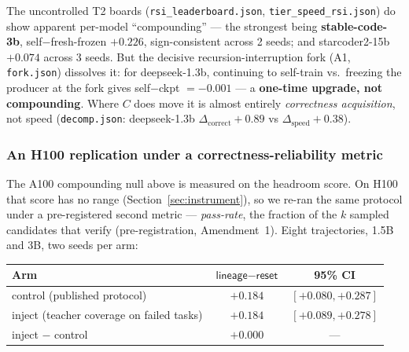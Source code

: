 \noindent The uncontrolled T2 boards (\texttt{rsi\_leaderboard.json}, \texttt{tier\_speed\_rsi.json}) do show
apparent per-model ``compounding'' --- the strongest being \textbf{stable-code-3b}, self$-$fresh-frozen
$+0.226$, sign-consistent across 2 seeds; and starcoder2-15b $+0.074$ across 3 seeds. But the decisive
recursion-interruption fork (A1, \texttt{fork.json}) dissolves it: for deepseek-1.3b, continuing to self-train
vs.\ freezing the producer at the fork gives self$-$ckpt $=-0.001$ --- a \textbf{one-time upgrade, not
compounding}. Where $C$ does move it is almost entirely \emph{correctness acquisition}, not speed
(\texttt{decomp.json}: deepseek-1.3b $\Delta_{\text{correct}}+0.89$ vs $\Delta_{\text{speed}}+0.38$).


\subsubsection*{An H100 replication under a correctness-reliability metric}
The A100 compounding null above is measured on the headroom score. On H100 that score has no
range (Section~\ref{sec:instrument}), so we re-ran the same protocol under a pre-registered
second metric --- \emph{pass-rate}, the fraction of the $k$ sampled candidates that verify
(pre-registration, Amendment~1). Eight trajectories, 1.5B and 3B, two seeds per arm:

\begin{center}\small
\begin{tabular}{@{}lcc@{}}
\toprule
\textbf{Arm} & $\textsf{lineage}-\textsf{reset}$ & \textbf{95\% CI} \\
\midrule
control (published protocol) & $+0.184$ & $[+0.080, +0.287]$ \\
inject (teacher coverage on failed tasks) & $+0.184$ & $[+0.089, +0.278]$ \\
\midrule
inject $-$ control & $+0.000$ & --- \\
\bottomrule
\end{tabular}
\end{center}

